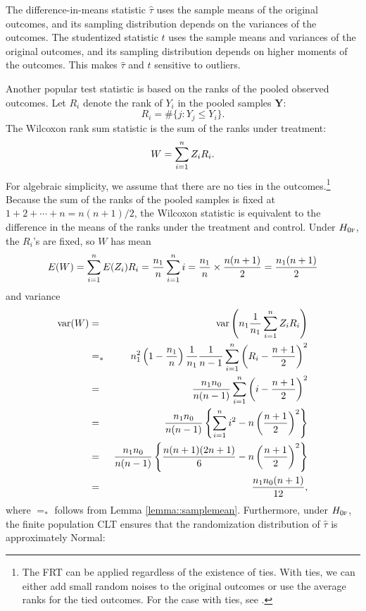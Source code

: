 \begin{example}\label{example::wilcoxon-cre}
The difference-in-means statistic $ \hat{\tau} $ uses the sample means of the original outcomes, and its sampling distribution depends on the variances of the outcomes. The studentized statistic $t$ uses the sample means and variances of the original outcomes, and its sampling distribution depends on higher moments of the outcomes. 
This makes $ \hat{\tau} $ and $t$ sensitive to outliers. 

Another popular test statistic is based on the ranks of the pooled observed outcomes. Let $R_i$ denote the rank of $Y_i$ in the pooled samples $\bm{Y}$: 
$$
R_i = \#\{j : Y_j \leq Y_i  \}.
$$ 
The Wilcoxon rank sum statistic is the sum of the ranks under treatment:
$$
W = \sum_{i=1}^n Z_i R_i.
$$
For algebraic simplicity, we assume that there are no ties in the outcomes.\footnote{ 
The FRT can be applied regardless of the existence of ties. With ties, we can either add small random noises to the original outcomes or use the average ranks for the tied outcomes.
For the case with ties, see \citet[][Chapter 1 Section 4]{lehmann2006nonparametrics}.
}
Because the sum of the ranks of the pooled samples is fixed at $1+2+\cdots + n = n(n+1)/2$, the Wilcoxon statistic is equivalent to the difference in the means of the ranks under the treatment and control. 
Under $H_{0\textsc{f}}$, the $R_i$'s are fixed, so
$W$ has mean
$$
E(W)  =  \sum_{i=1}^n E(Z_i) R_i  =\frac{n_1}{n}  \sum_{i=1}^n  i   = \frac{n_1}{n} \times \frac{n(n+1)}{2} = \frac{n_1(n+1)}{2} 
$$
and variance
\begin{eqnarray*}
\textup{var}(W) &=& \textup{var}\left( n_1 \frac{1}{n_1} \sum_{i=1}^n Z_i R_i  \right) \\
&=_*&  n_1^2  \left( 1-\frac{n_1}{n} \right)  \frac{1}{n_1}  \frac{1}{n-1} \sum_{i=1}^n \left(R_i - \frac{n+1}{2}  \right)^2\\
&=&  \frac{n_1 n_0}{n(n-1)} \sum_{i=1}^n \left(i - \frac{n+1}{2}  \right)^2\\
&=&   \frac{n_1 n_0}{n(n-1)}   \left\{ \sum_{i=1}^n i^2 - n \left(  \frac{n+1}{2}\right)^2     \right\}\\
&=&  \frac{n_1 n_0}{n(n-1)}  \left\{     \frac{n(n+1)(2n+1)}{6} -    n \left( \frac{n+1}{2}   \right)^2 \right\}  \\
&=& \frac{n_1 n_0 (n+1)}{12},
\end{eqnarray*}
where $=_*$ follows from Lemma \ref{lemma::samplemean}. 
Furthermore, under $H_{0\textsc{f}}$, the finite population CLT ensures that the randomization distribution of $\widehat{\tau}$ is approximately Normal:

\end{example}
